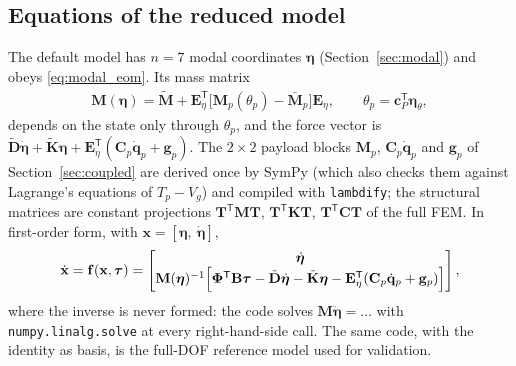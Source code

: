 \documentclass[10pt,a4paper]{article}
\numberwithin{equation}{section}
\begin{document}
\subsection{Equations of the reduced model}
The default model has $n = 7$ modal coordinates $\boldsymbol\eta$ (Section~\ref{sec:modal}) and obeys \eqref{eq:modal_eom}. Its mass matrix
\begin{gather}
\mathbf M(\boldsymbol\eta) = \tilde{\mathbf M} + \mathbf E_\eta^{\mathsf T}\bigl[\mathbf M_p(\theta_p) - \bar{\mathbf M}_p\bigr]\mathbf E_\eta,\qquad \theta_p = \mathbf c_P^{\mathsf T}\boldsymbol\eta_\theta,
\end{gather}
depends on the state only through $\theta_p$, and the force vector is $\tilde{\mathbf D}\dot{\boldsymbol\eta} + \tilde{\mathbf K}\boldsymbol\eta + \mathbf E_\eta^{\mathsf T}(\mathbf C_p\dot{\mathbf q}_p + \mathbf g_p)$. The $2\times2$ payload blocks $\mathbf M_p$, $\mathbf C_p\dot{\mathbf q}_p$ and $\mathbf g_p$ of Section~\ref{sec:coupled} are derived once by SymPy (which also checks them against Lagrange's equations of $T_p - V_g$) and compiled with \texttt{lambdify}; the structural matrices are constant projections $\mathbf T^{\mathsf T}\mathbf M\mathbf T$, $\mathbf T^{\mathsf T}\mathbf K\mathbf T$, $\mathbf T^{\mathsf T}\mathbf C\mathbf T$ of the full FEM. In first-order form, with $\mathbf x = [\boldsymbol\eta,\ \dot{\boldsymbol\eta}]$,
\begin{gather}
\dot{\mathbf x} = \mathbf f(\mathbf x,\boldsymbol\tau) = \begin{bmatrix}\dot{\boldsymbol\eta}\\ \mathbf M(\boldsymbol\eta)^{-1}\Bigl[\boldsymbol\Phi^{\mathsf T}\mathbf B\boldsymbol\tau - \tilde{\mathbf D}\dot{\boldsymbol\eta} - \tilde{\mathbf K}\boldsymbol\eta - \mathbf E_\eta^{\mathsf T}(\mathbf C_p\dot{\mathbf q}_p + \mathbf g_p)\Bigr]\end{bmatrix},
\end{gather}
where the inverse is never formed: the code solves $\mathbf M\ddot{\boldsymbol\eta} = \dots$ with \texttt{numpy.linalg.solve} at every right-hand-side call. The same code, with the identity as basis, is the full-DOF reference model used for validation.
\end{document}

